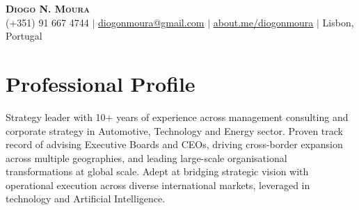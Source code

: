 \documentclass[a4paper,10pt]{article}
\begin{document}
\begin{center}
    \textbf{\Huge \scshape Diogo N. Moura} \\ \vspace{4pt}
    \small (+351) 91 667 4744 $|$
    \href{mailto:diogonmoura@gmail.com}{\underline{diogonmoura@gmail.com}} $|$
    \href{https://about.me/diogonmoura/}{\underline{about.me/diogonmoura}} $|$
    Lisbon, Portugal
\end{center}
\section{Professional Profile}
\small{Strategy leader with 10$+$ years of experience across management consulting and corporate strategy in Automotive, Technology and Energy sector. Proven track record of advising Executive Boards and CEOs, driving cross-border expansion across multiple geographies, and leading large-scale organisational transformations at global scale. Adept at bridging strategic vision with operational execution across diverse international markets, leveraged in technology and Artificial Intelligence.}
\vspace{2pt}
\end{document}
